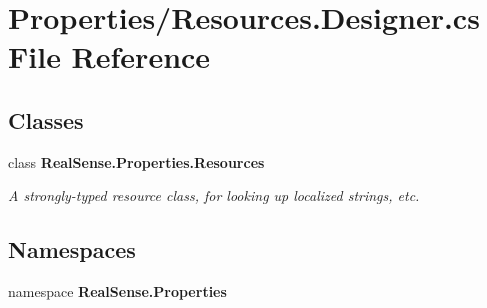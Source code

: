 \section{Properties/\+Resources.Designer.\+cs File Reference}
\label{_resources_8_designer_8cs}
\subsection*{Classes}
\begin{DoxyCompactItemize}
\item 
class {\bfseries Real\+Sense.\+Properties.\+Resources}
\begin{DoxyCompactList}\small\item\em A strongly-\/typed resource class, for looking up localized strings, etc. \end{DoxyCompactList}\end{DoxyCompactItemize}
\subsection*{Namespaces}
\begin{DoxyCompactItemize}
\item 
namespace \textbf{ Real\+Sense.\+Properties}
\end{DoxyCompactItemize}
